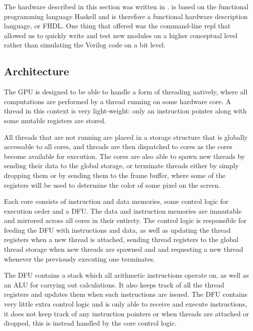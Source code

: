 		The hardware described in this section was written in \clash. \clash is
		based on the functional programming language Haskell and is therefore a
		functional hardware description language, or FHDL. One thing that
		\clash offered was the command-line repl that allowed us to quickly
		write and test new modules on a higher conceptual level rather than
		simulating the Verilog code on a bit level.

		\subsection{Architecture}

			The GPU is designed to be able to handle a form of threading
			natively, where all computations are performed by a thread running
			on some hardware core. A thread in this context is very
			light-weight: only an instruction pointer along with some mutable
			registers are stored.

			All threads that are not running are placed in a storage structure
			that is globally accessable to all cores, and threads are then
			dispatched to cores as the cores become available for execution.
			The cores are also able to spawn new threads by sending their data
			to the global storage, or terminate threads either by simply
			dropping them or by sending them to the frame buffer, where some of
			the registers will be used to determine the color of some pixel on
			the screen.

			Each core consists of instruction and data memories, some control 
			logic for execution order and a DFU. The data and instruction 
			memories are immutable and mirrored across all cores in their 
			entirety. The control logic is responsible for feeding the DFU with
			instructions and data, as well as updating the thread registers 
			when a new thread is attached, sending thread registers to the 
			global thread storage when new threads are spawned and and 
			requesting a new thread whenever the previously executing one 
			terminates.
			
			The DFU contains a stack which all arithmetic instructions operate
			on, as well as an ALU for carrying out calculations. It also keeps
			track of all the thread registers and updates them when such
			instructions are issued. The DFU contains very little extra control
			logic and is only able to receive and execute instructions, it does
			not keep track of any instruction pointers or when threads are
			attached or dropped, this is instead handled by the core control
			logic.


